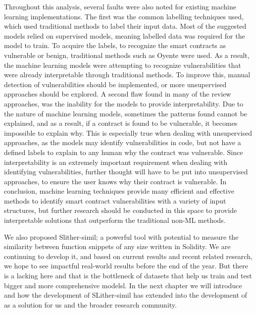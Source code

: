 Throughout this analysis, several faults were also noted for existing machine learning implementations.
The first was the common labelling techniques used, which used traditional methods to label their input data.
Most of the suggested models relied on supervised models, meaning labelled data was required for the model to train.
To acquire the labels, to recognize the smart contracts as vulnerable or benign, traditional methods such as Oyente were used.
As a result, the machine learning models were attempting to recognize vulnerabilities that were already interpretable through traditional methods.
To improve this, manual detection of vulnerabilities should be implemented, or more unsupervised approaches should be explored.
A second flaw found in many of the review approaches, was the inability for the models to provide interpretability.
Due to the nature of machine learning models, sometimes the patterns found cannot be explained, and as a result, if a contract is found to be vulnerable, it becomes impossible to explain why.
This is especially true when dealing with unsupervised approaches, as the models may identify vulnerabilities in code, but not have a defined labels to explain to any human why the contract was vulnerable.
Since interpretability is an extremely important requirement when dealing with identifying vulnerabilities, further thought will have to be put into unsupervised approaches, to ensure the user knows why their contract is vulnerable.
In conclusion, machine learning techniques provide many efficient and effective methods to identify smart contract vulnerabilities with a variety of input structures, but further research should be conducted in this space to provide interpretable solutions that outperform the traditional non-ML methods.

We also proposed Slither-simil; a powerful tool with potential to measure the similarity between function snippets of any size written in Solidity.
We are continuing to develop it, and based on current results and recent related research, we hope to see impactful real-world results before the end of the year.
But there is a lacking here and that is the bottleneck of datasets that help us train and test bigger and more comprehensive modelsl.
In the next chapter we will introduce \etherbase and how the development of SLither-simil has extended into the development of \etherbase as a solution for us and the broader research community.